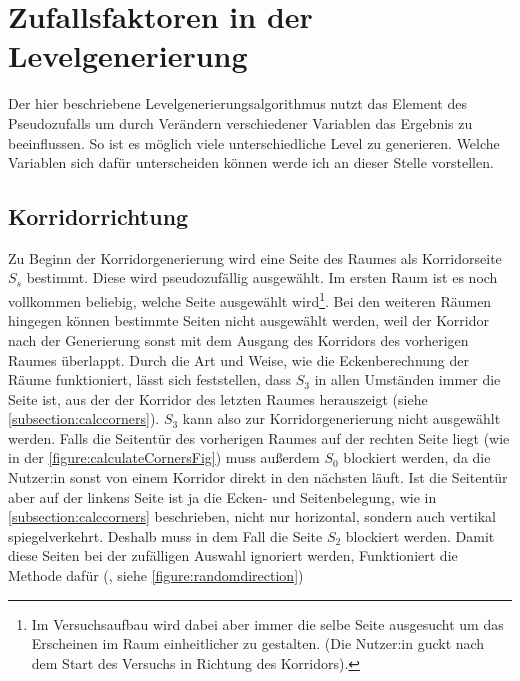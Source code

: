 \section{Zufallsfaktoren in der Levelgenerierung}
\label{sec:random}
Der hier beschriebene Levelgenerierungsalgorithmus nutzt das Element des Pseudozufalls um durch Verändern verschiedener Variablen das Ergebnis zu beeinflussen. So ist es möglich viele unterschiedliche Level zu generieren. Welche Variablen sich dafür unterscheiden können werde ich an dieser Stelle vorstellen.

\subsection{Korridorrichtung}

\begin{figure}[h!]
    \caption{}\label{figure:randomdirection}
\end{figure}
Zu Beginn der Korridorgenerierung wird eine Seite des Raumes als Korridorseite $S_s$ bestimmt. Diese wird pseudozufällig ausgewählt. Im ersten Raum ist es noch vollkommen beliebig, welche Seite ausgewählt wird\footnote{Im Versuchsaufbau wird dabei aber immer die selbe Seite ausgesucht um das Erscheinen im Raum einheitlicher zu gestalten. (Die Nutzer:in guckt nach dem Start des Versuchs in Richtung des Korridors).}.
Bei den weiteren Räumen hingegen können bestimmte Seiten nicht ausgewählt werden, weil der Korridor nach der Generierung sonst mit dem Ausgang des Korridors des vorherigen Raumes überlappt.
Durch die Art und Weise, wie die Eckenberechnung der Räume funktioniert, lässt sich feststellen, dass $S_3$ in allen Umständen immer die Seite ist, aus der der Korridor des letzten Raumes herauszeigt (siehe \autoref{subsection:calccorners}). $S_3$ kann also zur Korridorgenerierung nicht ausgewählt werden.
Falls die Seitentür des vorherigen Raumes auf der rechten Seite liegt (wie in der \autoref{figure:calculateCornersFig}) muss außerdem $S_0$ blockiert werden, da die Nutzer:in sonst von einem Korridor direkt in den nächsten läuft. Ist die Seitentür aber auf der linkens Seite ist ja die Ecken- und Seitenbelegung, wie in \autoref{subsection:calccorners} beschrieben, nicht nur horizontal, sondern auch vertikal spiegelverkehrt. Deshalb muss in dem Fall die Seite $S_2$ blockiert werden.
Damit diese Seiten bei der zufälligen Auswahl ignoriert werden, Funktioniert die Methode dafür (, siehe \autoref{figure:randomdirection})
